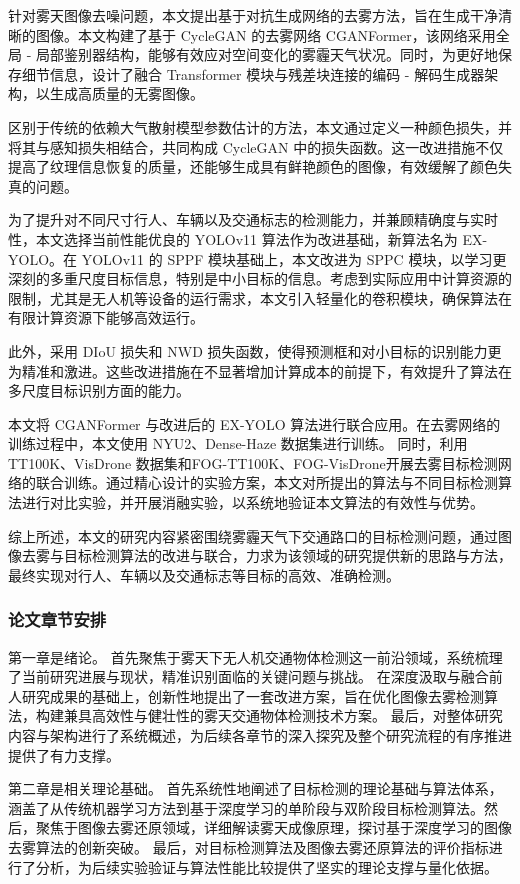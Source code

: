 针对雾天图像去噪问题，本文提出基于对抗生成网络的去雾方法，旨在生成干净清晰的图像。本文构建了基于 CycleGAN \cite{cgan}的去雾网络 CGANFormer，该网络采用全局 - 局部鉴别器结构，能够有效应对空间变化的雾霾天气状况。同时，为更好地保存细节信息，设计了融合 Transformer 模块与残差块连接的编码 - 解码生成器架构，以生成高质量的无雾图像。

区别于传统的依赖大气散射模型参数估计的方法，本文通过定义一种颜色损失，并将其与感知损失相结合，共同构成 CycleGAN 中的损失函数。这一改进措施不仅提高了纹理信息恢复的质量，还能够生成具有鲜艳颜色的图像，有效缓解了颜色失真的问题。

为了提升对不同尺寸行人、车辆以及交通标志的检测能力，并兼顾精确度与实时性，本文选择当前性能优良的 YOLOv11 算法作为改进基础，新算法名为 EX-YOLO。在 YOLOv11 的 SPPF 模块基础上，本文改进为 SPPC 模块，以学习更深刻的多重尺度目标信息，特别是中小目标的信息。考虑到实际应用中计算资源的限制，尤其是无人机等设备的运行需求，本文引入轻量化的卷积模块，确保算法在有限计算资源下能够高效运行。

此外，采用 DIoU 损失和 NWD 损失函数\cite{nwd}，使得预测框和对小目标的识别能力更为精准和激进。这些改进措施在不显著增加计算成本的前提下，有效提升了算法在多尺度目标识别方面的能力。

本文将 CGANFormer 与改进后的 EX-YOLO 算法进行联合应用。在去雾网络的训练过程中，本文使用 NYU2\cite{nyu2}、Dense-Haze\cite{NTIRE_Dehazing_2019} 数据集进行训练。
同时，利用 TT100K\cite{tt100k}、VisDrone\cite{vd} 数据集和FOG-TT100K、FOG-VisDrone开展去雾目标检测网络的联合训练。通过精心设计的实验方案，本文对所提出的算法与不同目标检测算法进行对比实验，并开展消融实验，以系统地验证本文算法的有效性与优势。

综上所述，本文的研究内容紧密围绕雾霾天气下交通路口的目标检测问题，通过图像去雾与目标检测算法的改进与联合，力求为该领域的研究提供新的思路与方法，最终实现对行人、车辆以及交通标志等目标的高效、准确检测。

\subsubsection{论文章节安排}

第一章是绪论。
首先聚焦于雾天下无人机交通物体检测这一前沿领域，系统梳理了当前研究进展与现状，精准识别面临的关键问题与挑战。
在深度汲取与融合前人研究成果的基础上，创新性地提出了一套改进方案，旨在优化图像去雾检测算法，构建兼具高效性与健壮性的雾天交通物体检测技术方案。
最后，对整体研究内容与架构进行了系统概述，为后续各章节的深入探究及整个研究流程的有序推进提供了有力支撑。

第二章是相关理论基础。
首先系统性地阐述了目标检测的理论基础与算法体系，涵盖了从传统机器学习方法到基于深度学习的单阶段与双阶段目标检测算法。然后，聚焦于图像去雾还原领域，详细解读雾天成像原理，探讨基于深度学习的图像去雾算法的创新突破。
最后，对目标检测算法及图像去雾还原算法的评价指标进行了分析，为后续实验验证与算法性能比较提供了坚实的理论支撑与量化依据。

